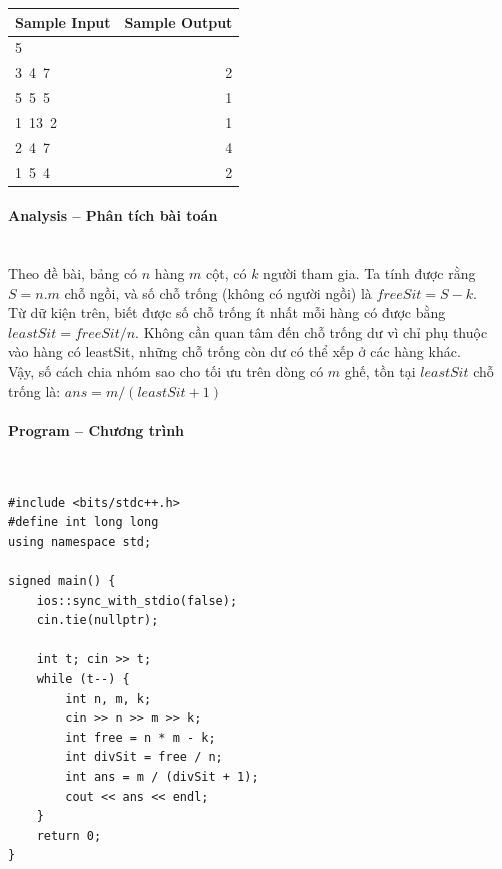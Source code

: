 \documentclass{article}
\begin{document}
\begin{table}[h]
    \centering
    \begin{tabular}{|l|r|}
        \hline
        \rowcolor{gray!30}
        \textbf{Sample Input} & \textbf{Sample Output} \\
        \hline
        5 & \\
        3\ 4\ 7 & 2 \\
        5\ 5\ 5 & 1 \\
        1\ 13\ 2 & 1 \\
        2\ 4\ 7 & 4 \\
        1\ 5\ 4 & 2 \\
        \hline
    \end{tabular}
\end{table}

\paragraph{Analysis -- Phân tích bài toán} \mbox{} \\

Theo đề bài, bảng có $n$ hàng $m$ cột, có $k$ người tham gia. Ta tính được rằng $S = n . m$ chỗ ngồi, và số chỗ trống (không có người ngồi) là $freeSit = S - k.$ \\

Từ dữ kiện trên, biết được số chỗ trống ít nhất mỗi hàng có được bằng $leastSit = freeSit / n$. Không cần quan tâm đến chỗ trống dư vì chỉ phụ thuộc vào hàng có leastSit, những chỗ trống còn dư có thể xếp ở các hàng khác.\\

Vậy, số cách chia nhóm sao cho tối ưu trên dòng có $m$ ghế, tồn tại $leastSit$ chỗ trống là: $ans = m / (leastSit + 1)$

\paragraph{Program -- Chương trình} \mbox{} \\

\begin{lstlisting}
#include <bits/stdc++.h>
#define int long long
using namespace std;

signed main() {
	ios::sync_with_stdio(false);
	cin.tie(nullptr);

	int t; cin >> t;
	while (t--) {
		int n, m, k;
		cin >> n >> m >> k;
		int free = n * m - k;
		int divSit = free / n;
		int ans = m / (divSit + 1);
		cout << ans << endl;
	}
	return 0;
}
\end{lstlisting}
\end{document}
